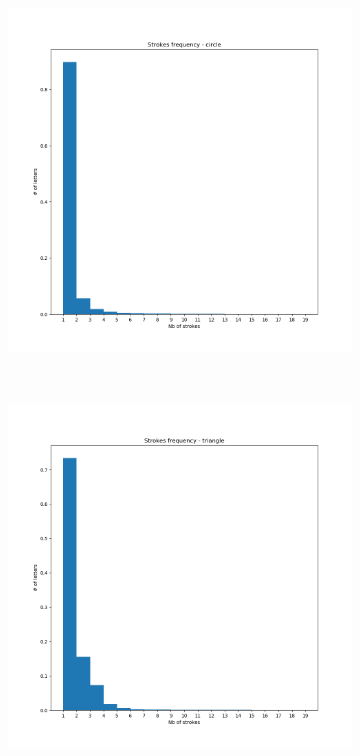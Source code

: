 \begin{figure}
    \centering
    \begin{subfigure}{0.3\textwidth}
        \includegraphics[scale=0.28]{images/dataset/strokes_frequency_circle.png}
    \end{subfigure}
    ~
    \begin{subfigure}{0.3\textwidth}
        \includegraphics[scale=0.28]{images/dataset/strokes_frequency_triangle.png}

\end{subfigure}
\end{figure}

